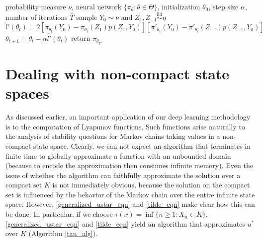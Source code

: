 \documentclass[pdflatex,sn-mathphys-ay]{sn-jnl}%
\numberwithin{equation}{section}
\newcommand\sbk[1]{\left[#1\right]}
\theoremstyle{thmstyleone}%
\theoremstyle{thmstyletwo}%
\theoremstyle{thmstylethree}%
\begin{document}
\begin{algorithm}
\caption{Density RGA}\label{den_alg}
\begin{algorithmic}
\Require probability measure $\nu$, neural network $\{\pi_\theta:\theta\in\Theta\}$, initialization $\theta_0$, step size $\alpha$, number of iterations $\bar{T}$
\State sample $Y_0\sim\nu$ and $Z_1,Z_{-1}\stackrel{\text{iid}}{\sim}\eta$
\State $\hat{l}'(\theta_t)=2\sbk{\pi_{\theta_t}(Y_0)-\pi_{\theta_t}(Z_1)p(Z_1,Y_0)}\sbk{\pi'_{\theta_t}(Y_0)-\pi'_{\theta_t}(Z_{-1})p(Z_{-1},Y_0)}$
\State $\theta_{t+1}=\theta_t-\alpha\hat{l'}(\theta_t)$
\EndFor
\State return $\pi_{\theta_{\bar{T}}}$
\end{algorithmic}
\end{algorithm}
\section{Dealing with non-compact state spaces}
\label{noncompact_section}
As discussed earlier, an important application of our deep learning methodology is to the computation of Lyapunov functions. Such functions arise naturally to the analysis of stability questions for Markov chains taking values in a non-compact state space. Clearly, we can not expect an algorithm that terminates in finite time to globally approximate a function with an unbounded domain (because to encode the approximation then consumes infinite memory). Even the issue of whether the algorithm can faithfully approximate the solution over a compact set $K$ is not immediately obvious, because the solution on the compact set is influenced by the behavior of the Markov chain over the entire infinite state space. However, \eqref{generalized_ustar_eqn} and \eqref{tilde_eqn} make clear how this can be done. In particular, if we choose $\tau(x)=\inf\{n\geq1:X_n\in K\}$, \eqref{generalized_ustar_eqn} and \eqref{tilde_eqn} yield an algorithm that approximates $u^*$ over $K$ (Algorithm \ref{tau_alg}).
\end{document}
